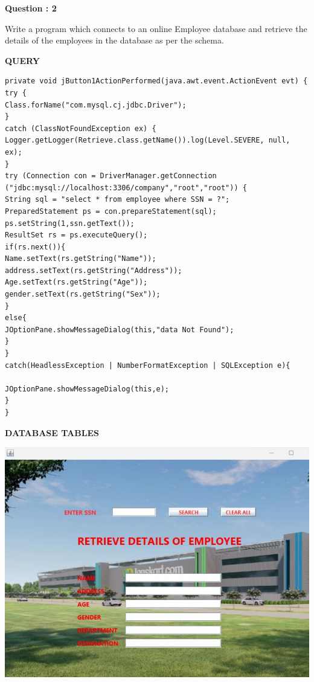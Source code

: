 \documentclass[a4paper,12pt]{report}
\begin{document}
\begin{flushleft}
    \textbf{Question : 2}
\end{flushleft}
Write a program which connects to 
an online Employee database and 
retrieve the details of the 
employees in the database as per 
the schema.
\begin{flushleft}
\textbf{QUERY }
\end{flushleft}
 \begin{verbatim}
private void jButton1ActionPerformed(java.awt.event.ActionEvent evt) {
try {
Class.forName("com.mysql.cj.jdbc.Driver");
}
catch (ClassNotFoundException ex) {
Logger.getLogger(Retrieve.class.getName()).log(Level.SEVERE, null, ex);
}
try (Connection con = DriverManager.getConnection
("jdbc:mysql://localhost:3306/company","root","root")) {
String sql = "select * from employee where SSN = ?";
PreparedStatement ps = con.prepareStatement(sql);
ps.setString(1,ssn.getText());
ResultSet rs = ps.executeQuery();
if(rs.next()){
Name.setText(rs.getString("Name"));
address.setText(rs.getString("Address"));
Age.setText(rs.getString("Age"));
gender.setText(rs.getString("Sex"));
}
else{
JOptionPane.showMessageDialog(this,"data Not Found");
}
}
catch(HeadlessException | NumberFormatException | SQLException e){

JOptionPane.showMessageDialog(this,e);
}
}

\end{verbatim}
\begin{flushleft}
\textbf{DATABASE TABLES}
\end{flushleft}
\includegraphics[scale=0.4]{Connectivity2.png}
\end{document}

